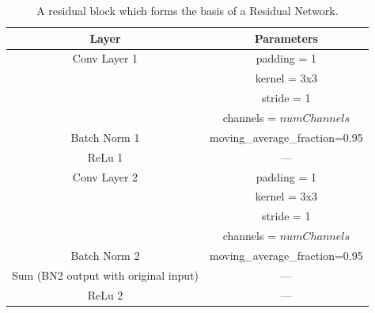 \documentclass{article}
\begin{document}
	
	
	
	
	
	
	\begin{table}[tbh]
		\begin{center}
			\caption{A residual block which forms the basis of a Residual Network.}
			\begin{tabular}{| c | c | }
				\hline
				Layer & Parameters \\
				\hline \hline
				Conv Layer 1 & padding = 1 \\
				& kernel = 3x3 \\
				& stride = 1 \\
				& channels = $numChannels$ \\
				\hline
				Batch Norm 1 & moving\_average\_fraction=0.95 \\
				\hline
				ReLu 1 & --- \\
				\hline
				Conv Layer 2 & padding = 1 \\
				& kernel = 3x3 \\
				& stride = 1 \\
				& channels = $numChannels$ \\
				\hline
				Batch Norm 2 & moving\_average\_fraction=0.95 \\
				\hline
				Sum (BN2 output with original input) & --- \\
				\hline
				ReLu 2 & --- \\
				\hline
			\end{tabular}
			\label{table:resnet56_block}
		\end{center}
	\end{table}
	
\end{document}
